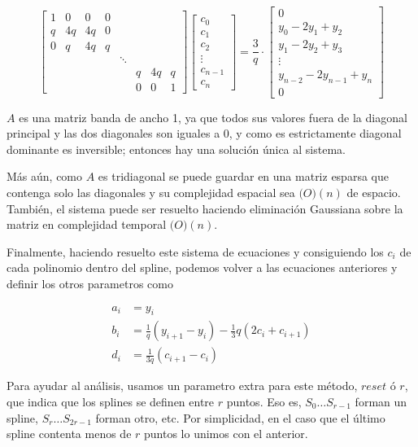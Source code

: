 \[
\begin{bmatrix}
1 & 0 & 0 & 0 \\
q & 4 q & 4 q & 0 \\
0 & q & 4 q & q \\
&&&& \ddots \\
&&&&& q & 4 q & q \\
&&&&& 0 & 0 & 1
\end{bmatrix}
\begin{bmatrix}
c_0 \\
c_1 \\
c_2 \\
\vdots \\
c_{n - 1} \\
c_n
\end{bmatrix}
=
\frac{3}{q} \cdot \begin{bmatrix}
0 \\
y_0 - 2 y_1 + y_2 \\
y_1 - 2 y_2 + y_3 \\
\vdots \\
y_{n - 2} - 2 y_{n - 1} + y_n \\
0
\end{bmatrix}
\]

$A$ es una matriz banda de ancho 1, ya que todos sus valores fuera de la
diagonal principal y las dos diagonales son iguales a $0$, y como es
estrictamente diagonal dominante es inversible; entonces hay una soluci\'on
\'unica al sistema.

M\'as a\'un, como $A$ es tridiagonal se puede guardar en una matriz esparsa que
contenga solo las diagonales y su complejidad espacial sea $\mathbb(O)(n)$ de
espacio. Tambi\'en, el sistema puede ser resuelto haciendo eliminaci\'on
Gaussiana sobre la matriz en complejidad temporal $\mathbb(O)(n)$.

Finalmente, haciendo resuelto este sistema de ecuaciones y consiguiendo los
$c_i$ de cada polinomio dentro del spline, podemos volver a las ecuaciones
anteriores y definir los otros parametros como

\[
\begin{split}
a_i & = y_i \\
b_i & = \frac{1}{q} (y_{i + 1} - y_i) - \frac{1}{3} q (2 c_i + c_{i + 1}) \\
d_i & = \frac{1}{3 q} (c_{i + 1} - c_i)
\end{split}
\]

Para ayudar al an\'alisis, usamos un parametro extra para este m\'etodo,
$reset$ \'o $r$, que indica que los splines se definen entre $r$ puntos. Eso es,
$S_0 \ldots S_{r - 1}$ forman un spline, $S_r \ldots S_{2r - 1}$ forman otro,
etc. Por simplicidad, en el caso que el \'ultimo spline contenta menos de $r$
puntos lo unimos con el anterior.
